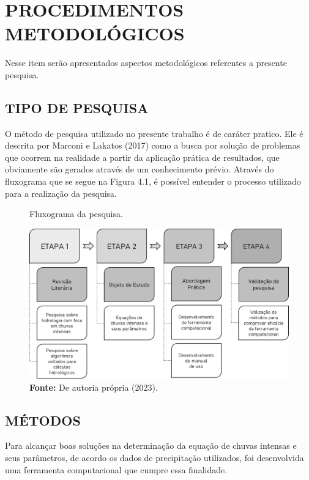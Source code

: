 \chapter{PROCEDIMENTOS METODOLÓGICOS}


Nesse item serão apresentados aspectos metodológicos referentes a
presente pesquisa.

\section{TIPO DE PESQUISA}

O método de pesquisa utilizado no presente trabalho é de caráter pratico. Ele é descrita por Marconi e Lakatos (2017) como a busca por solução de problemas que ocorrem na realidade a partir da aplicação prática de resultados, que obviamente são gerados através de um conhecimento prévio. Através do fluxograma que se segue na Figura 4.1, é possível entender o processo utilizado para a realização da pesquisa.\bigskip

\begin{figure}[!ht]
	\centering
	\caption{Fluxograma da pesquisa.}
	\includegraphics[width=.7625\linewidth]{figuras/fluxograma_de_pesquisa.png}
	\caption*{\textbf{Fonte:} De autoria própria (2023).}
	\label{fig:fluxograma_de_pesquisa.png}
\end{figure}


\section{MÉTODOS}

Para alcançar boas soluções na determinação da equação de chuvas intensas e seus parâmetros, de acordo os dados de precipitação utilizados, foi desenvolvida uma ferramenta computacional que cumpre essa finalidade.

